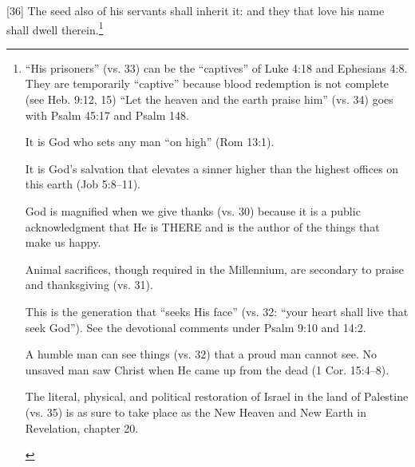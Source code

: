 [36] \textcolor[rgb]{0.00,0.00,1.00}{The seed also of his servants shall inherit it: and they that love his name shall dwell therein.}\footnote{“His prisoners” (vs. 33) can be the “captives” of Luke 4:18 and Ephesians 4:8. They are temporarily “captive” because blood redemption is not complete (see Heb. 9:12, 15) “Let the heaven and the earth praise him” (vs. 34) goes with Psalm 45:17 and Psalm 148. \cite{Ruckman1992Psalms} 
\begin{compactenum}
\item It is God who sets any man “on high” (Rom 13:1).
\item It is God’s salvation that elevates a sinner higher than the highest offices on this earth (Job 5:8–11).
\item God is magnified when we give thanks (vs. 30) because it is a public acknowledgment that He is THERE and is the author of the things that make us happy.
\item Animal sacrifices, though required in the Millennium, are secondary to praise and thanksgiving (vs. 31).
\item This is the generation that “seeks His face” (vs. 32: “your heart shall live that seek God”). See the devotional comments under Psalm 9:10 and 14:2.
\item A humble man can see things (vs. 32) that a proud man cannot see. No unsaved man saw Christ when He came up from the dead (1 Cor. 15:4–8).
\item The literal, physical, and political restoration of Israel in the land of Palestine (vs. 35) is as sure to take place as the New Heaven and New Earth in Revelation, chapter 20.
\end{compactenum} }
